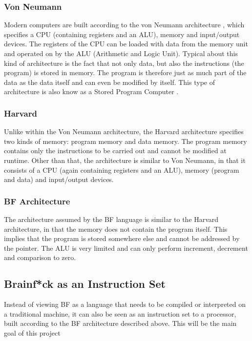 \subsubsection{Von Neumann}
Modern computers are built according to the von Neumann architecture \cite{vonneumann-wiki}, which specifies a CPU (containing registers and an ALU), memory and input/output devices. The registers of the CPU can be loaded with data from the memory unit and operated on by the ALU (Arithmetic and Logic Unit). Typical about this kind of architecture is the fact that not only data, but also the instructions (the program) is stored in memory. The program is therefore just as much part of the data as the data itself and can even be modified by itself. This type of architecture is also know as a Stored Program Computer \cite{vonneumann-geeks}.

\subsubsection{Harvard}
Unlike within the Von Neumann architecture, the Harvard architecture specifies two kinds of memory: program memory and data memory. The program memory contains only the instructions to be carried out and cannot be modified at runtime. Other than that, the architecture is similar to Von Neumann, in that it consists of a CPU (again containing registers and an ALU), memory (program and data) and input/output devices.

\subsubsection{BF Architecture}
The architecture assumed by the BF language is similar to the Harvard architecture, in that the memory does not contain the program itself. This implies that the program is stored somewhere else and cannot be addressed by the pointer. The ALU is very limited and can only perform increment, decrement and comparison to zero.

\subsection{Brainf*ck as an Instruction Set}
Instead of viewing BF as a language that needs to be compiled or interpreted on a traditional machine, it can also be seen as an instruction set to a processor, built according to the BF architecture described above. This will be the main goal of this project
